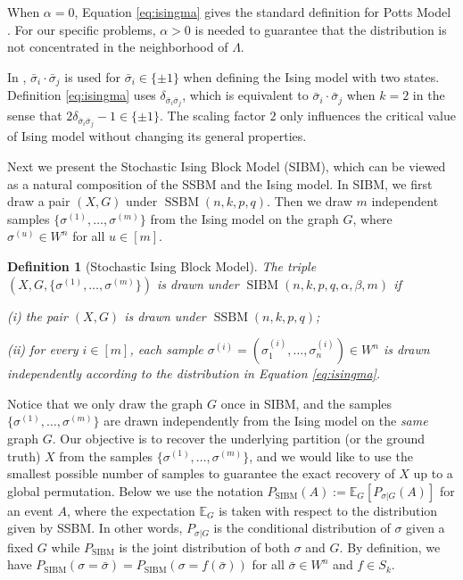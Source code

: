 \documentclass[conference]{IEEEtran}
\newtheorem{definition}{Definition}%
\DeclareMathOperator{\SSBM}{SSBM}
\DeclareMathOperator{\SIBM}{SIBM}
\begin{document}
	When $\alpha=0$, Equation \eqref{eq:isingma} gives the standard definition for Potts Model \cite{potts1952some}.
	For our specific problems, $\alpha > 0$ is needed to guarantee that the distribution is not concentrated in the neighborhood of $\Lambda$.
	
	In \cite{ye2020exact}, $\bar{\sigma}_i \cdot \bar{\sigma}_j$ is used for $\bar{\sigma}_i \in \{\pm 1\}$ when defining the Ising model with two states.
	Definition \ref{eq:isingma} uses  $\delta_{\bar{\sigma}_i\bar{\sigma}_j}$, which is equivalent to $\bar{\sigma}_i \cdot \bar{\sigma}_j$ when $k=2$ in the sense that $2\delta_{\bar{\sigma}_i\bar{\sigma}_j} - 1 \in \{\pm 1\}$. The scaling factor $2$ only influences the
	critical value of Ising model without changing its general properties.
	
	Next we present the Stochastic Ising Block Model (SIBM), which can be viewed as a natural composition of the SSBM and the Ising model. In SIBM, we first draw a pair $(X,G)$ under $\SSBM(n,k,p,q)$.  Then we draw $m$ independent samples $\{\sigma^{(1)},\dots,\sigma^{(m)}\}$ from the Ising model on the graph $G$, where $\sigma^{(u)}\in W^n$ for all $u\in[m]$.
	
	\begin{definition}[Stochastic Ising Block Model]
		The triple $(X,G,\{\sigma^{(1)},\dots,\sigma^{(m)}\})$ is drawn under $\SIBM(n,k, p,q,\alpha,\beta,m)$ if
		
		\noindent
		(i) the pair $(X,G)$ is drawn under $\SSBM(n,k, p,q)$;
		
		\noindent
		(ii) for every $i\in[m]$, each sample $\sigma^{(i)}=(\sigma_1^{(i)},\dots,\sigma_n^{(i)}) \in W^n$ is drawn independently according to the distribution in Equation \eqref{eq:isingma}.
	\end{definition}
	
	Notice that we only draw the graph $G$ once in SIBM, and the samples $\{\sigma^{(1)},\dots,\sigma^{(m)}\}$ are drawn independently from the Ising model on the {\em same} graph $G$.
	Our objective is to recover the underlying partition (or the ground truth) $X$ from the samples $\{\sigma^{(1)},\dots,\sigma^{(m)}\}$, and we would like to use the smallest possible number of samples to guarantee the exact recovery of $X$ up to a global permutation.
	Below we use the notation $P_{\SIBM}(A):=\mathbb{E}_G[P_{\sigma|G}(A)]$ for an event $A$, where the expectation $\mathbb{E}_G$ is taken with respect to the distribution given by SSBM. In other words, $P_{\sigma|G}$ is the conditional distribution of  $\sigma$ given a fixed $G$ while $P_{\SIBM}$ is the joint distribution of both $\sigma$ and $G$.
	By definition, we have $P_{\SIBM}(\sigma=\bar{\sigma})=P_{\SIBM}(\sigma=f(\bar{\sigma}))$ for all $\bar{\sigma}\in W^n$ and $f\in S_k$.
	
\end{document}
